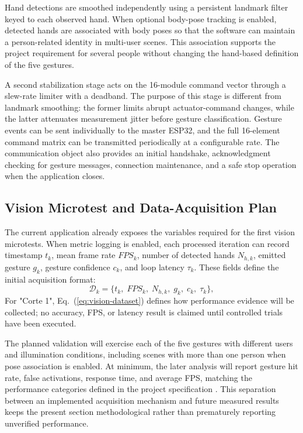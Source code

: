 \documentclass[lettersize,journal]{IEEEtran}
\begin{document}
Hand detections are smoothed independently using a persistent landmark filter keyed to each observed hand. When optional body-pose tracking is enabled, detected hands are associated with body poses so that the software can maintain a person-related identity in multi-user scenes. This association supports the project requirement for several people without changing the hand-based definition of the five gestures.

A second stabilization stage acts on the 16-module command vector through a slew-rate limiter with a deadband. The purpose of this stage is different from landmark smoothing: the former limits abrupt actuator-command changes, while the latter attenuates measurement jitter before gesture classification. Gesture events can be sent individually to the master ESP32, and the full 16-element command matrix can be transmitted periodically at a configurable rate. The communication object also provides an initial handshake, acknowledgment checking for gesture messages, connection maintenance, and a safe stop operation when the application closes.

\subsection{Vision Microtest and Data-Acquisition Plan}
\label{sec:vision-metrics}

The current application already exposes the variables required for the first vision microtests. When metric logging is enabled, each processed iteration can record timestamp $t_k$, mean frame rate $FPS_k$, number of detected hands $N_{h,k}$, emitted gesture  $g_k$, gesture confidence $c_k$, and loop latency $\tau_k$. These fields define the initial acquisition format:
\begin{equation}
\mathcal{D}_k=\{t_k,\; FPS_k,\; N_{h,k},\; g_k,\; c_k,\; \tau_k\},
\label{eq:vision-dataset}
\end{equation}
For "Corte 1", Eq.~(\ref{eq:vision-dataset}) defines how performance evidence will be collected; no accuracy, FPS, or latency result is claimed until controlled trials have been executed.

The planned validation will exercise each of the five gestures with different users and illumination conditions, including scenes with more than one person when pose association is enabled. At minimum, the later analysis will report gesture hit rate, false activations, response time, and average FPS, matching the performance categories defined in the project specification \cite{labdst2026sc}. This separation between an implemented acquisition mechanism and future measured results keeps the present section methodological rather than prematurely reporting unverified performance.
\end{document}
